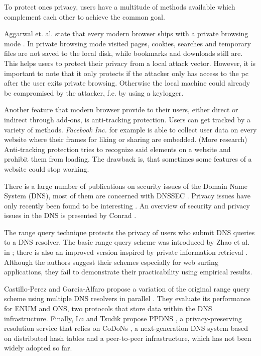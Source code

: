 \documentclass[a4paper]{llncs}
\begin{document}

To protect ones privacy, users have a multitude of methods available which complement each other to achieve the common goal.

Aggarwal et. al. state that every modern browser ships with a private browsing mode \cite{Aggarwal:2010:APB:1929820.1929828}. In private browsing mode visited pages, cookies, searches and temporary files are not saved to the local disk, while bookmarks and downloads still are. This helps users to protect their privacy from a local attack vector. However, it is important to note that it only protects if the attacker only has access to the pc after the user exits private browsing. Otherwise the local machine could already be compromised by the attacker, f.e. by using a keylogger.

Another feature that modern browser provide to their users, either direct or indirect through add-ons, is anti-tracking protection. Users can get tracked by a variety of methods. \textit{Facebook Inc.} for example is able to collect user data on every website where their frames for liking or sharing are embedded. (More research) Anti-tracking protection tries to recognize said elements on a website and prohibit them from loading. The drawback is, that sometimes some features of a website could stop working.





\vspace{20pt}

There is a large number of publications on security issues of the Domain Name System (DNS), most of them are concerned with DNSSEC \cite{rfc4033}. Privacy issues have only recently been found to be interesting \cite{rfc7626}. An overview of security and privacy issues in the DNS is presented by Conrad \cite{Conrad12-dnssecurity}.

The range query technique protects the privacy of users who submit DNS queries to a DNS resolver. The basic range query scheme was introduced by Zhao et al. in \cite{Zhao:2007a}; there is also an improved version \cite{Zhao:2007b} inspired by private information retrieval \cite{Chor:1995}.
Although the authors suggest their schemes especially for web surfing applications, they fail to demonstrate their practicability using empirical results.

Castillo-Perez and Garcia-Alfaro propose a variation of the original range query scheme \cite{Zhao:2007a} using multiple DNS resolvers in parallel \cite{Castillo-Perez:2008,Castillo-Perez:2009}. They evaluate its performance for ENUM and ONS, two protocols that store data within the DNS infrastructure. Finally, Lu and Tsudik propose PPDNS \cite{Lu:2010}, a privacy-preserving resolution service that relies on CoDoNs \cite{RamasubramanianS04-codons}, a next-generation DNS system based on distributed hash tables and a peer-to-peer infrastructure, which has not been widely adopted so far.
\end{document}
